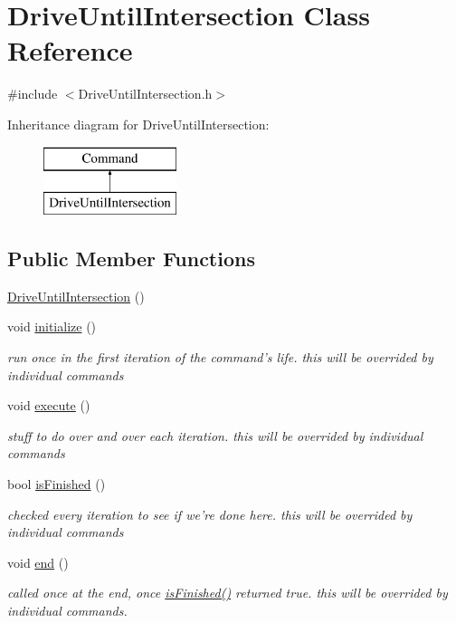 \hypertarget{classDriveUntilIntersection}{\section{Drive\-Until\-Intersection Class Reference}
\label{classDriveUntilIntersection}
}


{\ttfamily \#include $<$Drive\-Until\-Intersection.\-h$>$}

Inheritance diagram for Drive\-Until\-Intersection\-:\begin{figure}[H]
\begin{center}
\leavevmode
\includegraphics[height=2.000000cm]{classDriveUntilIntersection}
\end{center}
\end{figure}
\subsection*{Public Member Functions}
\begin{DoxyCompactItemize}
\item 
\hyperlink{classDriveUntilIntersection_a7cfe773856d717eb645c3788e414186d}{Drive\-Until\-Intersection} ()
\item 
void \hyperlink{classDriveUntilIntersection_a7f42c796bcea682dea57f1439cc59f7b}{initialize} ()
\begin{DoxyCompactList}\small\item\em run once in the first iteration of the command's life. this will be overrided by individual commands \end{DoxyCompactList}\item 
void \hyperlink{classDriveUntilIntersection_ae670d4da34843889558d42c94fc1e292}{execute} ()
\begin{DoxyCompactList}\small\item\em stuff to do over and over each iteration. this will be overrided by individual commands \end{DoxyCompactList}\item 
bool \hyperlink{classDriveUntilIntersection_a345809c722142166801f6ecbca117758}{is\-Finished} ()
\begin{DoxyCompactList}\small\item\em checked every iteration to see if we're done here. this will be overrided by individual commands \end{DoxyCompactList}\item 
void \hyperlink{classDriveUntilIntersection_a309d1f37d92844707c2f3dcb2f5d5638}{end} ()
\begin{DoxyCompactList}\small\item\em called once at the end, once \hyperlink{classDriveUntilIntersection_a345809c722142166801f6ecbca117758}{is\-Finished()} returned true. this will be overrided by individual commands. \end{DoxyCompactList}\end{DoxyCompactItemize}
